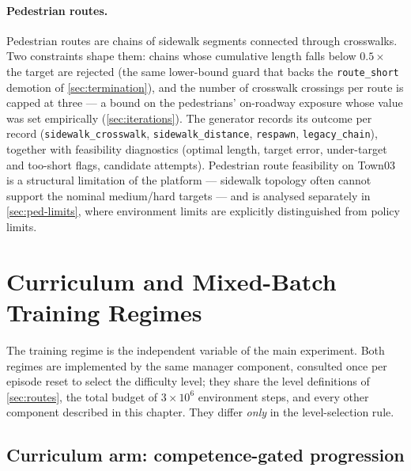 \paragraph{Pedestrian routes.}
Pedestrian routes are chains of sidewalk segments connected through
crosswalks. Two constraints shape them: chains whose cumulative length
falls below $0.5 \times$ the target are rejected (the same lower-bound
guard that backs the \texttt{route\_short} demotion of
\cref{sec:termination}), and the number of crosswalk crossings per route
is capped at three --- a bound on the pedestrians' on-roadway exposure
whose value was set empirically (\cref{sec:iterations}). The generator
records its outcome per record (\texttt{sidewalk\_crosswalk},
\texttt{sidewalk\_distance}, \texttt{respawn}, \texttt{legacy\_chain}),
together with feasibility diagnostics (optimal length, target error,
under-target and too-short flags, candidate attempts). Pedestrian route
feasibility on Town03 is a structural limitation of the platform ---
sidewalk topology often cannot support the nominal medium/hard targets ---
and is analysed separately in \cref{sec:ped-limits}, where environment
limits are explicitly distinguished from policy limits.


\section{Curriculum and Mixed-Batch Training Regimes}
\label{sec:regimes}

The training regime is the independent variable of the main experiment.
Both regimes are implemented by the same manager component, consulted once
per episode reset to select the difficulty level; they share the level
definitions of \cref{sec:routes}, the total budget of $3 \times 10^6$
environment steps, and every other component described in this chapter.
They differ \emph{only} in the level-selection rule.

\subsection{Curriculum arm: competence-gated progression}
\label{sec:curriculum-arm}

